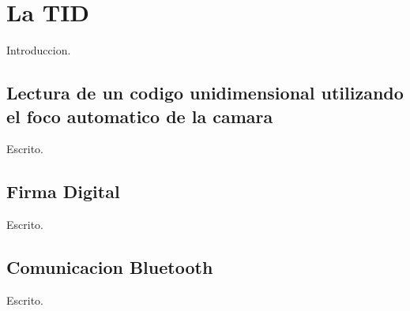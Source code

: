 \chapter{La \acf{TID}}
\label{sec:tid}

Introduccion.

\section{Lectura de un codigo unidimensional utilizando el foco automatico de la camara}
\label{sec:tid.1DcodeReader}

Escrito.

\section{Firma Digital}
\label{sec:tid.digitalSignature}

Escrito.

\section{Comunicacion Bluetooth}
\label{sec:tid.bluetooth}

Escrito.